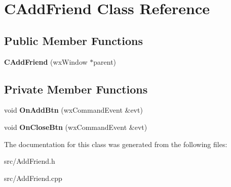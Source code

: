 \section{CAddFriend Class Reference}
\label{classCAddFriend}
\subsection*{Public Member Functions}
\begin{DoxyCompactItemize}
\item 
{\bfseries CAddFriend} (wxWindow $\ast$parent)\label{classCAddFriend_a513e871a1b6d73e0103b95644fc8d946}

\end{DoxyCompactItemize}
\subsection*{Private Member Functions}
\begin{DoxyCompactItemize}
\item 
void {\bfseries OnAddBtn} (wxCommandEvent \&evt)\label{classCAddFriend_a3e22777272ffc01aaf12878e5a5b0b69}

\item 
void {\bfseries OnCloseBtn} (wxCommandEvent \&evt)\label{classCAddFriend_aefcab89dc9df73921cb321f948ca8816}

\end{DoxyCompactItemize}


The documentation for this class was generated from the following files:\begin{DoxyCompactItemize}
\item 
src/AddFriend.h\item 
src/AddFriend.cpp\end{DoxyCompactItemize}
